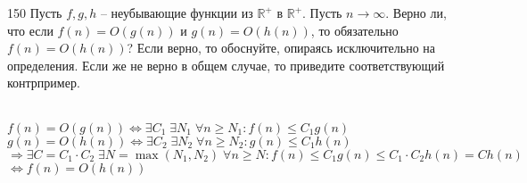 \begin{task}{150}
Пусть $f, g, h$ -- неубывающие функции из $\mathbb{R^+}$ в $\mathbb{R^+}$. Пусть $n\rightarrow\infty$. Верно ли, что если $f(n)=O(g(n))$ и $g(n)=O(h(n))$, то обязательно $f(n)=O(h(n))$? Если верно, то обоснуйте, опираясь исключительно на определения. Если же не верно в общем случае, то приведите соответствующий контрпример.
\end{task}

\begin{solution}\\
$f(n)=O(g(n)) \Leftrightarrow \exists C_1 \;\exists N_1\; \forall n\geq N_1: f(n)\leq C_1 g(n)$\\
$g(n)=O(h(n)) \Leftrightarrow \exists C_2 \;\exists N_2\; \forall n\geq N_2: g(n)\leq C_1 h(n)$\\
$\Rightarrow \exists C=C_1\cdot C_2\; \exists N=\max(N_1, N_2)\;\forall n\geq N: f(n)\leq C_1 g(n)\leq C_1\cdot C_2 h(n)=Ch(n)$
$\Leftrightarrow f(n)=O(h(n))$ 
\end{solution}